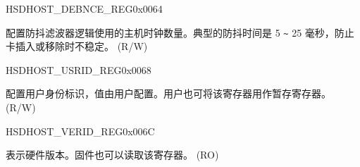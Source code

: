\begin{register}{H}{SDHOST\_DEBNCE\_REG}{0x0064}\label{regdesc:SDHOSTDEBNCEREG}
%
%
\regnewline%
\begin{regdesc}\begin{reglist}
\label{fielddesc:SDHOSTDEBOUNCECOUNT}\item [SDHOST\_DEBOUNCE\_COUNT] 配置防抖滤波器逻辑使用的主机时钟数量。典型的防抖时间是 5 \verb+~+ 25 毫秒，防止卡插入或移除时不稳定。 (R/W)
\end{reglist}\end{regdesc}
\end{register}


\begin{register}{H}{SDHOST\_USRID\_REG}{0x0068}\label{regdesc:SDHOSTUSRIDREG}
%
\regnewline%
\begin{regdesc}\begin{reglist}
\label{fielddesc:SDHOSTUSRIDREG}\item [SDHOST\_USRID\_REG] 配置用户身份标识，值由用户配置。用户也可将该寄存器用作暂存寄存器。 (R/W)
\end{reglist}\end{regdesc}
\end{register}


\begin{register}{H}{SDHOST\_VERID\_REG}{0x{}006C}\label{regdesc:VERIDREG}
%
\regnewline%
\begin{regdesc}\begin{reglist}
\item [SDHOST\_VERSIONID\_REG] 表示硬件版本。固件也可以读取该寄存器。 (RO)
\end{reglist}\end{regdesc}
\end{register}


